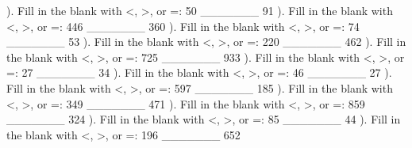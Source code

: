 \documentclass{article}%
\begin{document}
\newline%
\newline%
). Fill in the blank with <, >, or =: 50 \_\_\_\_\_\_\_ 91%
\newline%
\newline%
). Fill in the blank with <, >, or =: 446 \_\_\_\_\_\_\_ 360%
\newline%
\newline%
). Fill in the blank with <, >, or =: 74 \_\_\_\_\_\_\_ 53%
\newline%
\newline%
). Fill in the blank with <, >, or =: 220 \_\_\_\_\_\_\_ 462%
\newline%
\newline%
). Fill in the blank with <, >, or =: 725 \_\_\_\_\_\_\_ 933%
\newline%
\newline%
). Fill in the blank with <, >, or =: 27 \_\_\_\_\_\_\_ 34%
\newline%
\newline%
). Fill in the blank with <, >, or =: 46 \_\_\_\_\_\_\_ 27%
\newline%
\newline%
). Fill in the blank with <, >, or =: 597 \_\_\_\_\_\_\_ 185%
\newline%
\newline%
). Fill in the blank with <, >, or =: 349 \_\_\_\_\_\_\_ 471%
\newline%
\newline%
). Fill in the blank with <, >, or =: 859 \_\_\_\_\_\_\_ 324%
\newline%
\newline%
). Fill in the blank with <, >, or =: 85 \_\_\_\_\_\_\_ 44%
\newline%
\newline%
). Fill in the blank with <, >, or =: 196 \_\_\_\_\_\_\_ 652%
\newline%
\end{document}
